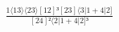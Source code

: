 \documentclass[varwidth, border=5pt]{standalone}
\begin{document}
\begin{my}
$\begin{gathered}
\scriptscriptstyle\frac{1⟨13⟩⟨23⟩[12]³[23]⟨3|1+4|2]}{[24]²⟨2|1+4|2]³}
\end{gathered}$
\end{my}
\end{document}
